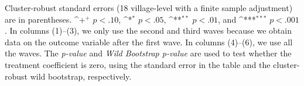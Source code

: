 \documentclass[fleqn,11pt]{article}
\newcommand{\sym}[1]{\rlap{$#1$}}
\def\sym#1{\ifmmode^{#1}\else\(^{#1}\)\fi
}
\begin{document}
\begin{table}[h]
\begin{adjustbox}{max width=\textwidth}
\begin{threeparttable}
\begin{tabular}{l*{7}{c}}
% 
% 
% 
\hline\hline
\end{tabular}
\begin{tablenotes}
\item Cluster-robust standard errors (18 village-level with a finite sample adjustment) are in parentheses. \sym{+} \(p<.10\), \sym{*} \(p<.05\), \sym{**} \(p<.01\), and \sym{***} \(p<.001\). In columns (1)--(3), we only use the second and third waves because we obtain data on the outcome variable after the first wave. In columns (4)--(6), we use all the waves. The \textit{p-value} and \textit{Wild Bootstrap p-value} are used to test whether the treatment coefficient is zero, using the standard error in the table and the  cluster-robust wild bootstrap, respectively.
\end{tablenotes}
\end{threeparttable}
 \end{adjustbox}
\end{table}
% 
\end{document}
